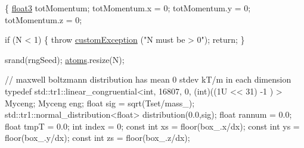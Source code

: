\begin{DoxyCode}
                                                                               
                           \{
    \hyperlink{structfloat3}{float3} totMomentum;
    totMomentum.x = 0; totMomentum.y = 0; totMomentum.z = 0;

    \textcolor{keywordflow}{if} (N < 1) \{
    \textcolor{keywordflow}{throw} \hyperlink{classcustom_exception}{customException} (\textcolor{stringliteral}{"N must be > 0"});
    \textcolor{keywordflow}{return};
    \}

    srand(rngSeed);
    \hyperlink{classsystem_definition_ae8814d3f60fc1111af2a3f218a4bfcab}{atoms}.resize(N);

    \textcolor{comment}{// maxwell boltzmann distribution has mean 0 stdev kT/m in each dimension}
    \textcolor{keyword}{typedef} std::tr1::linear\_congruential<int, 16807, 0, (int)((1U << 31) -1 ) 
      > Myceng;
    Myceng eng;
    \textcolor{keywordtype}{float} sig = sqrt(Tset/mass\_);
    std::tr1::normal\_distribution<float> distribution(0.0,sig);
    \textcolor{keywordtype}{float} rannum = 0.0;
    \textcolor{keywordtype}{float} tmpT = 0.0;
    \textcolor{keywordtype}{int} index = 0;
    \textcolor{keyword}{const} \textcolor{keywordtype}{int} xs = floor(box\_.x/dx);
    \textcolor{keyword}{const} \textcolor{keywordtype}{int} ys = floor(box\_.y/dx);
    \textcolor{keyword}{const} \textcolor{keywordtype}{int} zs = floor(box\_.z/dx);
    

\end{DoxyCode}
